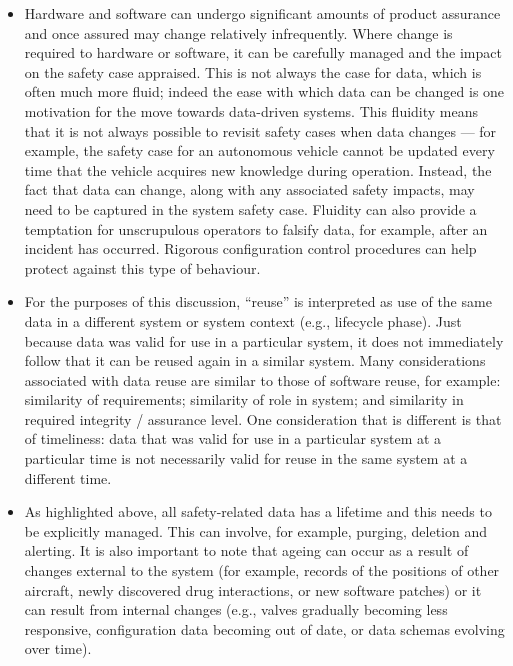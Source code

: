 \begin{itemize}
  \item {} Hardware and software can undergo significant amounts of product assurance and once assured may change relatively infrequently. Where change is required to hardware or software, it can be carefully managed and the impact on the safety case appraised. This is not always the case for data, which is often much more fluid; indeed the ease with which data can be changed is one motivation for the move towards data-driven systems. This fluidity means that it is not always possible to revisit safety cases when data changes --- for example, the safety case for an autonomous vehicle cannot be updated every time that the vehicle acquires new knowledge during operation. Instead, the fact that data can change, along with any associated safety impacts, may need to be captured in the system safety case. Fluidity can also provide a temptation for unscrupulous operators to falsify data, for example, after an incident has occurred. Rigorous configuration control procedures can help protect against this type of behaviour.

  \item {} For the purposes of this discussion, ``reuse'' is interpreted as use of the same data in a different system or system context (e.g., lifecycle phase). Just because data was valid for use in a particular system, it does not immediately follow that it can be reused again in a similar system. Many considerations associated with data reuse are similar to those of software reuse, for example: similarity of requirements; similarity of role in system; and similarity in required integrity / assurance level. One consideration that is different is that of timeliness: data that was valid for use in a particular system at a particular time is not necessarily valid for reuse in the same system at a different time.

  \item {} As highlighted above, all safety-related data has a lifetime and this needs to be explicitly managed. This can involve, for example, purging, deletion and alerting. It is also important to note that ageing can occur as a result of changes external to the system (for example, records of the positions of other aircraft, newly discovered drug interactions, or new software patches) or it can result from internal changes (e.g., valves gradually becoming less responsive, configuration data becoming out of date, or data schemas evolving over time).


\end{itemize}
